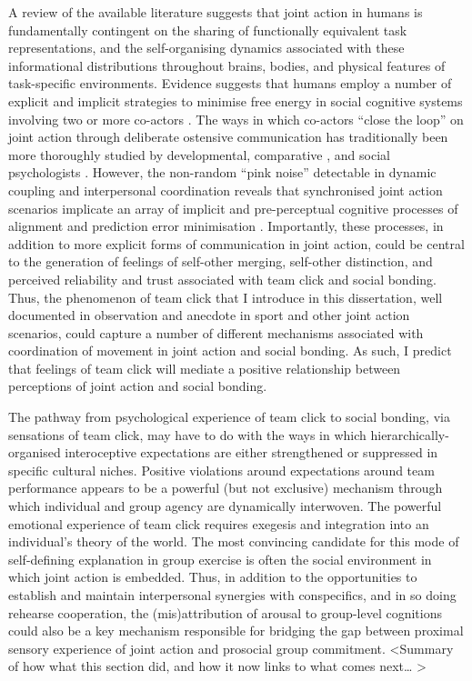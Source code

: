 \begin{CJK}{UTF8}{gbsn}
A review of the available literature suggests that joint action in humans is fundamentally contingent on the sharing of functionally equivalent task representations, and the self-organising dynamics associated with these informational distributions throughout brains, bodies, and physical features of task-specific environments.  Evidence suggests that humans employ a number of explicit and implicit strategies to minimise free energy in social cognitive systems involving two or more co-actors \citep{Semin2008,Frith2010}. The ways in which co-actors ``close the loop'' \citep{Frith2007} on joint action through deliberate ostensive communication has traditionally been more thoroughly studied by developmental, comparative \cite{Tomasello2005a}, and social psychologists \citep{Sebanz2006}.
However, the non-random ``pink noise'' detectable in dynamic coupling and interpersonal coordination reveals that synchronised joint action scenarios implicate an array of implicit and pre-perceptual cognitive processes of alignment and prediction error minimisation \citep{Schmidt2011}. Importantly, these processes, in addition to more explicit forms of communication in joint action, could be central to the generation of feelings of self-other merging, self-other distinction, and perceived reliability and trust associated with team click and social bonding.  Thus, the phenomenon of team click that I introduce in this dissertation, well documented in observation and anecdote in sport and other joint action scenarios, could capture a number of different mechanisms associated with coordination of movement in joint action and social bonding.  As such, I predict that feelings of team click will mediate a positive relationship between perceptions of joint action and social bonding.

The pathway from psychological experience of team click to social bonding, via sensations of team click, may have to do with the ways in which hierarchically-organised interoceptive expectations are either strengthened or suppressed in specific cultural niches.  Positive violations around expectations around team performance appears to be a powerful (but not exclusive) mechanism through which individual and group agency are dynamically interwoven.
The powerful emotional experience of team click requires exegesis and integration into an individual's theory of the world.  The most convincing candidate for this mode of self-defining explanation in group exercise is often the social environment in which joint action is embedded.  Thus, in addition to the opportunities to establish and maintain interpersonal synergies with conspecifics, and in so doing rehearse cooperation, the (mis)attribution of arousal \citep{Drachman1976} to group-level cognitions could also be a key mechanism responsible for bridging the gap between proximal sensory experience of joint action and prosocial group commitment.
<Summary of how what this section did, and how it now links to what comes next… >


\end{CJK}

